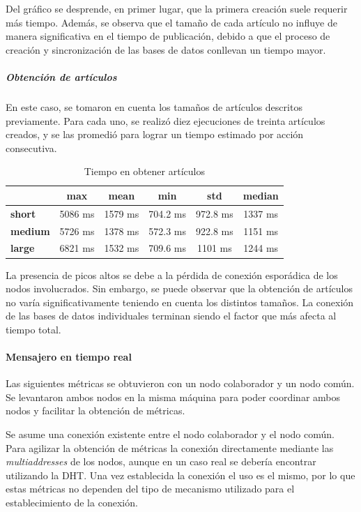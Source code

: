 Del gráfico se desprende, en primer lugar, que la primera creación suele requerir más tiempo. Además, se observa que el tamaño de cada artículo no influye de manera significativa en el tiempo de publicación, debido a que el proceso de creación y sincronización de las bases de datos conllevan un tiempo mayor.

\subparagraph{Obtención de artículos}

En este caso, se tomaron en cuenta los tamaños de artículos descritos previamente. Para cada uno, se realizó diez ejecuciones de treinta artículos creados, y se las promedió para lograr un tiempo estimado por acción consecutiva.

\setlength\tabcolsep{10pt}
\begin{table}[!htbp]
    \centering
    \begin{tabular}{|l|c|c|c|c|c|}
\hline
                & \textbf{max} & \textbf{mean} & \textbf{min} & \textbf{std} & \textbf{median} \\ \hline
\textbf{short}  & 5086 ms       & 1579 ms       & 704.2 ms     & 972.8 ms     & 1337 ms         \\ \hline
\textbf{medium} & 5726 ms      & 1378 ms       & 572.3 ms     & 922.8 ms     & 1151 ms         \\ \hline
\textbf{large}  & 6821 ms      & 1532 ms       & 709.6 ms     & 1101 ms      & 1244 ms         \\ \hline
\end{tabular}
    \caption{Tiempo en obtener artículos}
\end{table}  

La presencia de picos altos se debe a la pérdida de conexión esporádica de los nodos involucrados. Sin embargo, se puede observar que la obtención de artículos no varía significativamente teniendo en cuenta los distintos tamaños. La conexión de las bases de datos individuales terminan siendo el factor que más afecta al tiempo total.

\paragraph{Mensajero en tiempo real}

Las siguientes métricas se obtuvieron con un nodo colaborador y un nodo común. Se levantaron ambos nodos en la misma máquina para poder coordinar ambos nodos y facilitar la obtención de métricas.

Se asume una conexión existente entre el nodo colaborador y el nodo común. Para agilizar la obtención de métricas la conexión directamente mediante las \textit{multiaddresses} de los nodos, aunque en un caso real se debería encontrar utilizando la DHT. Una vez establecida la conexión el uso es el mismo, por lo que estas métricas no dependen del tipo de mecanismo utilizado para el establecimiento de la conexión.

